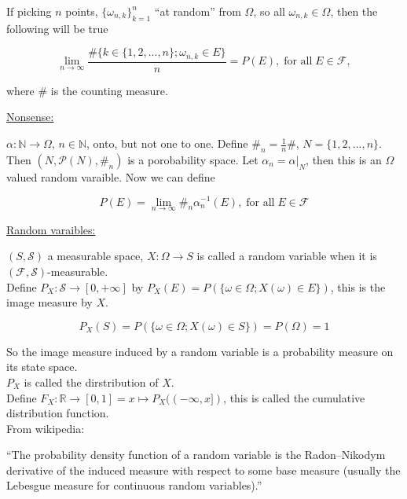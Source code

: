 \documentclass[12pt]{article}
\newcommand{\pset}[1]{ \mathcal{P}(#1) }
\newcommand{\nats}[0] { \mathbb{N}}
\newcommand{\reals}[0] { \mathbb{R}}
\newcommand{\F}[0] { \mathcal{F} }
\newcommand{\cS}[0] { \mathcal{S} }
\newcommand{\om}[0] { \omega }
\newcommand{\Om}[0] { \Omega }
\newcommand{\rarw}[0] { \rightarrow }
\begin{document}
If picking $n$ points, $\{ \om_{n,k}\}_{k=1}^n$ ``at random'' from $\Om$, so all $ \om_{n,k} \in \Om$, then the following will be true

$$
	\lim_{n \rarw \infty } \frac{ \#\{ k \in \{ 1,2,...,n\} ; \om_{n,k} \in E \} }{n} = P(E), \; \textrm{for all} \; E \in \F,
$$

where $\#$ is the counting measure. \\

\begin{flushleft}
\underline{Nonsense:}
\end{flushleft}

 $\alpha:  \nats \rarw \Om$, $n \in \nats$, onto, but not one to one. Define $\#_n = \frac{1}{n} \# $, $N = \{ 1,2,...,n \}$. Then $(N, \pset{N}, \#_n )$ is a porobability space. Let $\alpha_n = \alpha |_N$, then this is an $\Om$ valued random varaible. Now we can define

$$
	P(E) = \lim_{n \rarw \infty} \#_n \alpha_n^{-1} (E), \; \textrm{for all} \; E \in \F
$$




\begin{flushleft}
\underline{Random varaibles:}
\end{flushleft}

$(S, \cS)$ a measurable space, $X: \Om \rarw S $ is called a random variable when it is $(\F, \cS)$-measurable. \\

Define $P_X: \cS \rarw [0,+\infty]$ by $P_X(E) = P( \{ \om \in \Om; X(\om) \in E \})$, this is the image measure by $X$.

$$
	P_X(S) = P( \{  \om \in \Om; X(\om) \in S \} ) = P( \Om ) = 1
$$

So the image measure induced by a random variable is a probability measure on its state space. \\

$P_X$ is called the dirstribution of $X$. \\

Define $F_X : \reals \rarw [0,1] = x \mapsto P_X((-\infty,x])$, this is called the cumulative distribution function.\\

From wikipedia:

``The probability density function of a random variable is the Radon–Nikodym derivative of the induced measure with respect to some base measure (usually the Lebesgue measure for continuous random variables).''
\end{document}
